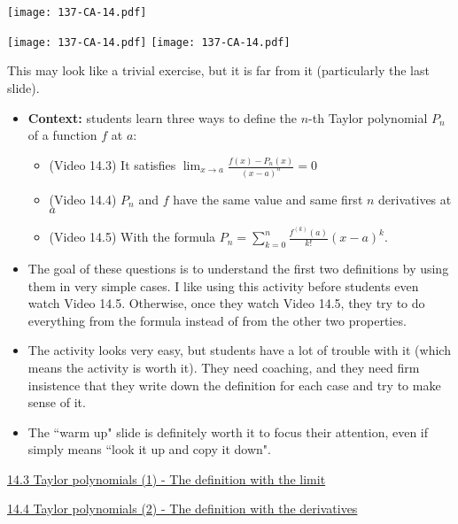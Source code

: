 \documentclass[11pt]{article}
\newcommand {\DS} [1] {${\displaystyle #1}$}
\newcommand{\nl}{\hfill \vspace{-1.1\baselineskip}} %
\newcommand{\viii}{\hspace{8mm}  \href{https://www.youtube.com/watch?v=aCFR5CABSA0&list=PLlwePzQY_wW9h32ZwS6CYsY4eR_b2pE9j&index=3}{14.3 Taylor polynomials (1) - The definition with the limit}}
\newcommand{\viv}{\hspace{8mm}  \href{https://www.youtube.com/watch?v=sNWY1w8YocM&list=PLlwePzQY_wW9h32ZwS6CYsY4eR_b2pE9j&index=4}{14.4 Taylor polynomials (2) - The definition with the derivatives}}
\begin{document}
\begin{center}
{ \texttt{[image: 137-CA-14.pdf]}} 
\vspace{-2cm}

{ \texttt{[image: 137-CA-14.pdf]}} \quad
{ \texttt{[image: 137-CA-14.pdf]}} 
\end{center}

\begin{warning}
This may look like a trivial exercise, but it is far from it (particularly the last slide).
\end{warning}

\begin{comments}
\nl
	\begin{itemize}
		\item {\bf Context:} students learn three ways to define the $n$-th Taylor polynomial $P_n$ of a function $f$ at $a$:
			\begin{itemize}
				\item (Video 14.3)  It satisfies \DS{\lim_{x \to a} \frac{f(x) - P_n(x)}{(x-a)^n} = 0}
				\item (Video 14.4)  $P_n$ and $f$ have the same value and same first $n$ derivatives at $a$
				\item (Video 14.5) With the formula \; \DS{P_n = \sum_{k=0}^{n} \frac{f^{(k)}(a)}{k!}(x-a)^k}.
			\end{itemize}
		\item The goal of these questions is to understand the first two definitions by using them in very simple cases.  I like using this activity before students even watch Video 14.5.  Otherwise, once they watch Video 14.5, they try to do everything from the formula instead of from the other two properties.
		\item The activity looks very easy, but students have a lot of trouble with it (which means the activity is worth it).  They need coaching, and they need firm insistence that they write down the definition for each case and try to make sense of it.
		\item The ``warm up" slide is definitely worth it to focus their attention, even if simply means ``look it up and copy it down".
	\end{itemize}
\end{comments}

\begin{videos}
\viii

\viv
\end{videos}
\end{document}
